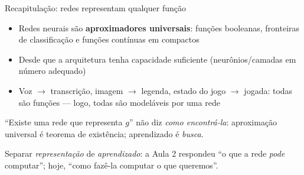 \documentclass[aspectratio=169, 11pt]{beamer}
\begin{document}
\begin{frame}{Recapitulação: redes representam qualquer função}
  \begin{itemize}\setlength{\itemsep}{0.4ex}
    \item Redes neurais são \textbf{aproximadores universais}: funções booleanas,
          fronteiras de classificação e funções contínuas em compactos
    \item Desde que a arquitetura tenha \alert{capacidade suficiente}
          (neurônios/camadas em número adequado)
    \item Voz $\to$ transcrição, imagem $\to$ legenda, estado do jogo $\to$ jogada:
          todas são funções — logo, todas são modeláveis por uma rede
  \end{itemize}

  \begin{alertabox}
    ``Existe uma rede que representa $g$'' \alert{não} diz \emph{como encontrá-la}:
    aproximação universal é teorema de existência; aprendizado é \emph{busca}.
  \end{alertabox}

  \begin{ideiabox}
    Separar \emph{representação} de \emph{aprendizado}: a Aula 2 respondeu
    ``o que a rede \emph{pode} computar''; hoje, ``como fazê-la computar o que
    queremos''.
  \end{ideiabox}
\end{frame}
\end{document}
